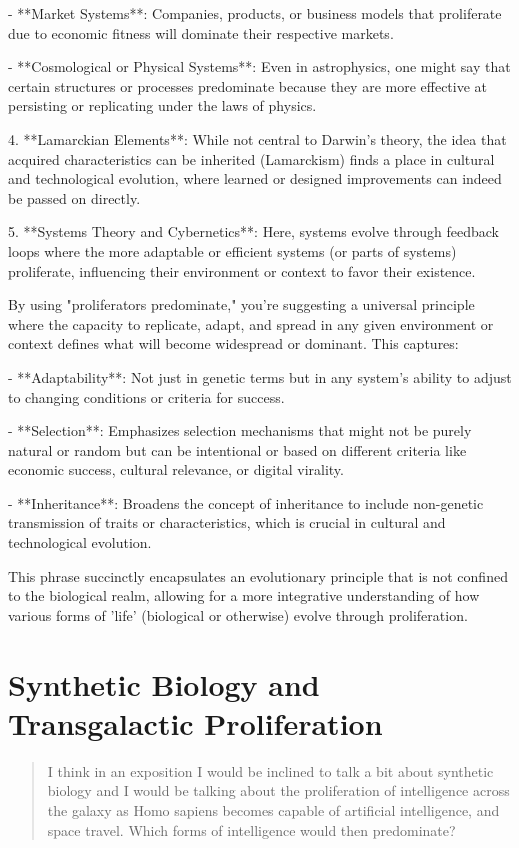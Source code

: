 \documentclass[12pt,titlepage]{book}
\begin{document}
   - **Market Systems**: Companies, products, or business models that proliferate due to economic fitness will dominate their respective markets.

   - **Cosmological or Physical Systems**: Even in astrophysics, one might say that certain structures or processes predominate because they are more effective at persisting or replicating under the laws of physics.

4. **Lamarckian Elements**: While not central to Darwin's theory, the idea that acquired characteristics can be inherited (Lamarckism) finds a place in cultural and technological evolution, where learned or designed improvements can indeed be passed on directly.

5. **Systems Theory and Cybernetics**: Here, systems evolve through feedback loops where the more adaptable or efficient systems (or parts of systems) proliferate, influencing their environment or context to favor their existence.

By using "proliferators predominate," you're suggesting a universal principle where the capacity to replicate, adapt, and spread in any given environment or context defines what will become widespread or dominant. This captures:

- **Adaptability**: Not just in genetic terms but in any system's ability to adjust to changing conditions or criteria for success.

- **Selection**: Emphasizes selection mechanisms that might not be purely natural or random but can be intentional or based on different criteria like economic success, cultural relevance, or digital virality.

- **Inheritance**: Broadens the concept of inheritance to include non-genetic transmission of traits or characteristics, which is crucial in cultural and technological evolution.

This phrase succinctly encapsulates an evolutionary principle that is not confined to the biological realm, allowing for a more integrative understanding of how various forms of 'life' (biological or otherwise) evolve through proliferation.

\section{Synthetic Biology and Transgalactic Proliferation}
\begin{quote}
I think in an exposition I would be inclined to talk a bit about synthetic biology and I would be talking about the proliferation of intelligence across the galaxy as Homo sapiens becomes capable of artificial intelligence, and space travel.  Which forms of intelligence would then predominate?
\end{quote}
\end{document}
